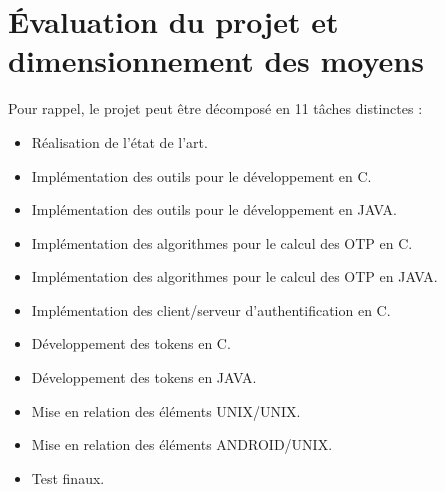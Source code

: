 \documentclass{../../res/univ-projet}
\begin{document}
\section{Évaluation du projet et dimensionnement des moyens}
Pour rappel, le projet peut être décomposé en 11 tâches distinctes :
\begin{itemize}
  \item Réalisation de l'état de l'art.
  \item Implémentation des outils pour le développement en C.
  \item Implémentation des outils pour le développement en JAVA.
  \item Implémentation des algorithmes pour le calcul des OTP en C.
  \item Implémentation des algorithmes pour le calcul des OTP en JAVA.
  \item Implémentation des client/serveur d'authentification en C.
  \item Développement des tokens en C.
  \item Développement des tokens en JAVA.
  \item Mise en relation des éléments UNIX/UNIX.
  \item Mise en relation des éléments ANDROID/UNIX.
  \item Test finaux.
\end{itemize}
\end{document}
